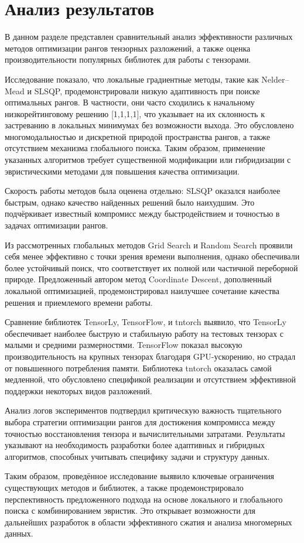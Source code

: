 \chapter{Анализ результатов}
\label{chap:eval}

В данном разделе представлен сравнительный анализ эффективности различных методов оптимизации рангов тензорных разложений, а также оценка производительности популярных библиотек для работы с тензорами.

Исследование показало, что локальные градиентные методы, такие как Nelder–Mead и SLSQP, продемонстрировали низкую адаптивность при поиске оптимальных рангов. В частности, они часто сходились к начальному низкорейтинговому решению [1,1,1,1], что указывает на их склонность к застреванию в локальных минимумах без возможности выхода. Это обусловлено многомодальностью и дискретной природой пространства рангов, а также отсутствием механизма глобального поиска. Таким образом, применение указанных алгоритмов требует существенной модификации или гибридизации с эвристическими методами для повышения качества оптимизации.

Скорость работы методов была оценена отдельно: SLSQP оказался наиболее быстрым, однако качество найденных решений было наихудшим. Это подчёркивает известный компромисс между быстродействием и точностью в задачах оптимизации рангов.

Из рассмотренных глобальных методов Grid Search и Random Search проявили себя менее эффективно с точки зрения времени выполнения, однако обеспечивали более устойчивый поиск, что соответствует их полной или частичной переборной природе. Предложенный автором метод Coordinate Descent, дополненный локальной оптимизацией, продемонстрировал наилучшее сочетание качества решения и приемлемого времени работы.

Сравнение библиотек TensorLy, TensorFlow, и tntorch выявило, что TensorLy обеспечивает наиболее быструю и стабильную работу на тестовых тензорах с малыми и средними размерностями. TensorFlow показал высокую производительность на крупных тензорах благодаря GPU-ускорению, но страдал от повышенного потребления памяти. Библиотека tntorch оказалась самой медленной, что обусловлено спецификой реализации и отсутствием эффективной поддержки некоторых видов разложений.

Анализ логов экспериментов подтвердил критическую важность тщательного выбора стратегии оптимизации рангов для достижения компромисса между точностью восстановления тензора и вычислительными затратами. Результаты указывают на необходимость разработки более адаптивных и гибридных алгоритмов, способных учитывать специфику задачи и структуру данных.

Таким образом, проведённое исследование выявило ключевые ограничения существующих методов и библиотек, а также продемонстрировало перспективность предложенного подхода на основе локального и глобального поиска с комбинированием эвристик. Это открывает возможности для дальнейших разработок в области эффективного сжатия и анализа многомерных данных.


